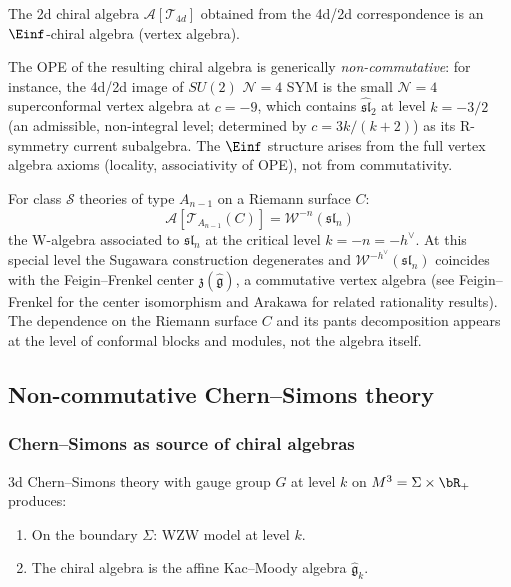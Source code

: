 \begin{theorem}\label{thm:4d2d-einf}
The 2d chiral algebra $\mathcal{A}[\mathcal{T}_{4d}]$ obtained from the 4d/2d
correspondence is an $\Einf$-chiral algebra (vertex algebra).

The OPE of the resulting chiral algebra is generically \emph{non-commutative}: for instance, the 4d/2d image of $SU(2)$ $\mathcal{N}=4$ SYM is the small $\mathcal{N}=4$ superconformal vertex algebra at $c = -9$, which contains $\widehat{\mathfrak{sl}}_2$ at level $k = -3/2$ (an admissible, non-integral level; determined by $c = 3k/(k+2)$) as its R-symmetry current subalgebra. The $\Einf$ structure arises from the full vertex algebra axioms (locality, associativity of OPE), not from commutativity.
\end{theorem}

\begin{example}\label{ex:class-s}
For class $\mathcal{S}$ theories of type $A_{n-1}$ on a Riemann surface $C$:
\[
\mathcal{A}[\mathcal{T}_{A_{n-1}}(C)] = \mathcal{W}^{-n}(\mathfrak{sl}_n)
\]
the W-algebra associated to $\mathfrak{sl}_n$ at the critical level $k = -n = -h^\vee$. At this special level the Sugawara construction degenerates and $\mathcal{W}^{-h^\vee}(\mathfrak{sl}_n)$ coincides with the Feigin--Frenkel center $\mathfrak{z}(\widehat{\mathfrak{g}})$, a commutative vertex algebra (see Feigin--Frenkel \cite{FF} for the center isomorphism and Arakawa \cite{Ara15} for related rationality results). The dependence on the Riemann surface $C$ and its pants decomposition appears at the level of conformal blocks and modules, not the algebra itself.
\end{example}


\subsection{Non-commutative Chern--Simons theory}
\label{sec:nc-chern-simons}

\subsubsection{Chern--Simons as source of chiral algebras}

\begin{construction}\label{constr:cs-boundary}
3d Chern--Simons theory with gauge group $G$ at level $k$ on $M^3 = \Sigma \times \bR_+$
produces:
\begin{enumerate}[label=(\roman*)]
\item On the boundary $\Sigma$: WZW model at level $k$.
\item The chiral algebra is the affine Kac--Moody algebra $\hat{\mathfrak{g}}_k$.
\end{enumerate}
\end{construction}

